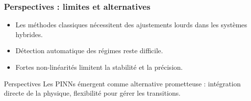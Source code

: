 \documentclass[handout]{beamer}
\newtheorem{pbm et hypo}[thm]{Problématique et hypothèses}
\begin{document}
	\begin{frame}
		\frametitle{Perspectives : limites et alternatives}
		\begin{itemize}
			\item[\maltese] Les méthodes classiques nécessitent des ajustements lourds dans les systèmes hybrides.
			\item[\maltese] Détection automatique des régimes reste difficile.
			\item[\maltese] Fortes non-linéarités limitent la stabilité et la précision.
		\end{itemize}
		\begin{alertblock}{Perspectives}
			Les PINNs émergent comme alternative prometteuse : intégration directe de la physique, flexibilité pour gérer les transitions.
		\end{alertblock}
	\end{frame}
	
	
\end{document}
